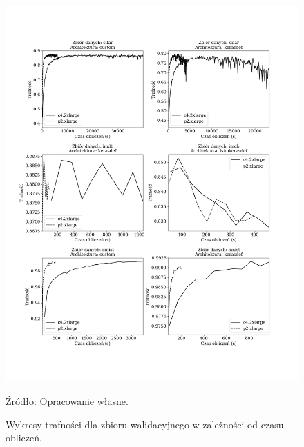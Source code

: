 \documentclass[12pt,a4paper,twoside]{article}
\newcommand{\source}[1]{\caption*{\hfill Źródło: {#1}} }
\begin{document}
\begin{figure}[h]
  \centering
\includegraphics[scale=0.5]{../obrazy/fig:experiment_acc_val_timecum.png}
\caption{Wykresy trafności dla zbioru walidacyjnego w zależności od czasu obliczeń.\label{fig:experiment_acc_val_timecum}}
\source{Opracowanie własne.}
\end{figure}
\end{document}
